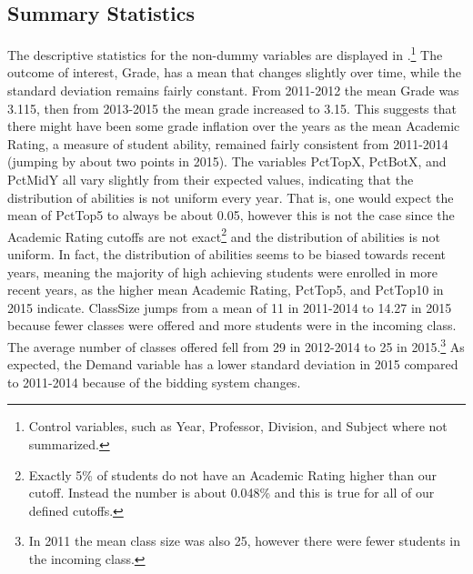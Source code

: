 \subsection{Summary Statistics}\label{summarystats}

The descriptive statistics for the non-dummy variables are displayed in .\footnote{Control variables, such as Year, Professor, Division, and Subject where not summarized.} 
The outcome of interest, Grade, has a mean that changes slightly over time, while the standard deviation remains fairly constant. 
From 2011-2012 the mean Grade was 3.115, then from 2013-2015 the mean grade increased to 3.15. 
This suggests that there might have been some grade inflation over the years as the mean Academic Rating, a measure of student ability, remained fairly consistent from 2011-2014 (jumping by about two points in 2015). 
The variables PctTopX, PctBotX, and PctMidY all vary slightly from their expected values, indicating that the distribution of abilities is not uniform every year. 
That is, one would expect the mean of PctTop5 to always be about 0.05, however this is not the case since the Academic Rating cutoffs are not exact\footnote{Exactly 5\% of students do not have an Academic Rating higher than our cutoff. Instead the number is about 0.048\% and this is true for all of our defined cutoffs.} and the distribution of abilities is not uniform. 
In fact, the distribution of abilities seems to be biased towards recent years, meaning the majority of high achieving students were enrolled in more recent years, as the higher mean Academic Rating, PctTop5, and PctTop10 in 2015 indicate. 
ClassSize jumps from a mean of 11 in 2011-2014 to 14.27 in 2015 because fewer classes were offered and more students were in the incoming class.
The average number of classes offered fell from 29 in 2012-2014 to 25 in 2015.\footnote{In 2011 the mean class size was also 25, however there were fewer students in the incoming class.}
As expected, the Demand variable has a lower standard deviation in 2015 compared to 2011-2014 because of the bidding system changes. 


